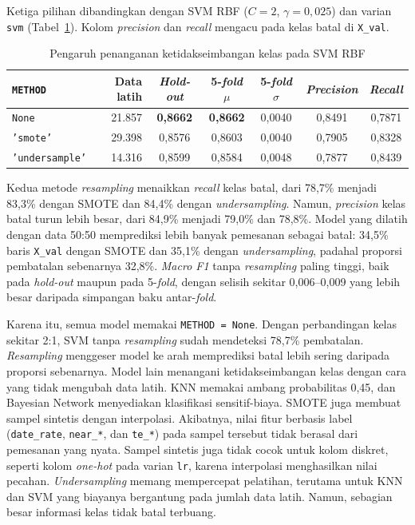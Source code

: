 Ketiga pilihan dibandingkan dengan SVM RBF ($C=2$, $\gamma=0{,}025$) dan
varian \texttt{svm} (Tabel~\ref{tab:imbalance}). Kolom \textit{precision} dan
\textit{recall} mengacu pada kelas batal di \texttt{X\_val}.

\begin{table}[H]
	\centering
	\caption{Pengaruh penanganan ketidakseimbangan kelas pada SVM RBF}
	\label{tab:imbalance}
	\small
	\setlength{\tabcolsep}{4pt}
	\begin{tabular}{l r c c c c c}
		\toprule
		\texttt{METHOD} & \textbf{Data latih} & \textbf{\textit{Hold-out}} & \textbf{5-\textit{fold} $\mu$} & \textbf{5-\textit{fold} $\sigma$} & \textbf{\textit{Precision}} & \textbf{\textit{Recall}} \\
		\midrule
		\texttt{None}          & 21.857 & \textbf{0,8662} & \textbf{0,8662} & 0,0040 & 0,8491 & 0,7871 \\
		\texttt{'smote'}       & 29.398 & 0,8576 & 0,8603 & 0,0040 & 0,7905 & 0,8328 \\
		\texttt{'undersample'} & 14.316 & 0,8599 & 0,8584 & 0,0048 & 0,7877 & 0,8439 \\
		\bottomrule
	\end{tabular}
\end{table}

Kedua metode \textit{resampling} menaikkan \textit{recall} kelas batal, dari
78,7\% menjadi 83,3\% dengan SMOTE dan 84,4\% dengan \textit{undersampling}.
Namun, \textit{precision} kelas batal turun lebih besar, dari 84,9\% menjadi
79,0\% dan 78,8\%. Model yang dilatih dengan data 50:50 memprediksi lebih banyak
pemesanan sebagai batal: 34,5\% baris \texttt{X\_val} dengan SMOTE dan 35,1\%
dengan \textit{undersampling}, padahal proporsi pembatalan sebenarnya 32,8\%.
\textit{Macro F1} tanpa \textit{resampling} paling tinggi, baik pada
\textit{hold-out} maupun pada 5-\textit{fold}, dengan selisih sekitar 0,006--0,009
yang lebih besar daripada simpangan baku antar-\textit{fold}.

Karena itu, semua model memakai \texttt{METHOD = None}. Dengan perbandingan kelas
sekitar 2:1, SVM tanpa \textit{resampling} sudah mendeteksi 78,7\% pembatalan.
\textit{Resampling} menggeser model ke arah memprediksi batal lebih sering
daripada proporsi sebenarnya. Model lain menangani ketidakseimbangan kelas dengan
cara yang tidak mengubah data latih. KNN memakai ambang probabilitas 0,45, dan
Bayesian Network menyediakan klasifikasi sensitif-biaya. SMOTE juga membuat sampel
sintetis dengan interpolasi. Akibatnya, nilai fitur berbasis label
(\texttt{date\_rate}, \texttt{near\_*}, dan \texttt{te\_*}) pada sampel tersebut
tidak berasal dari pemesanan yang nyata. Sampel sintetis juga tidak cocok untuk
kolom diskret, seperti kolom \textit{one-hot} pada varian \texttt{lr}, karena
interpolasi menghasilkan nilai pecahan. \textit{Undersampling} memang mempercepat
pelatihan, terutama untuk KNN dan SVM yang biayanya bergantung pada jumlah data
latih. Namun, sebagian besar informasi kelas tidak batal terbuang.

